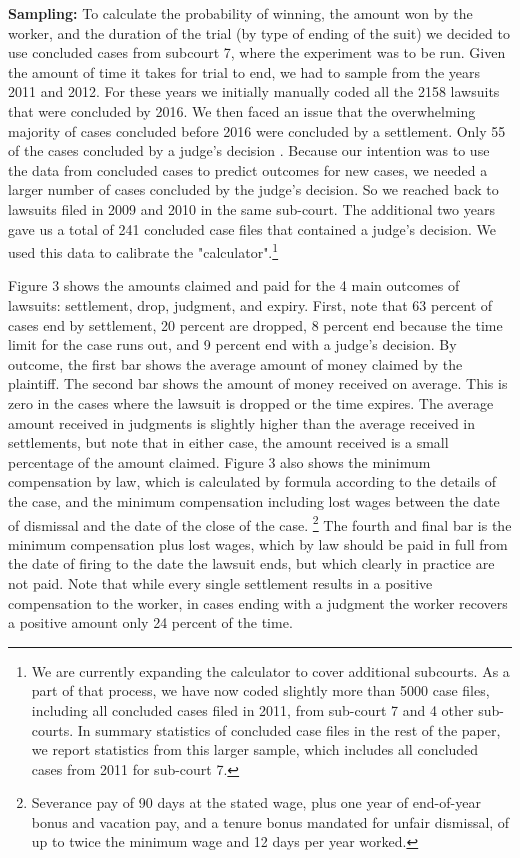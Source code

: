 \documentclass[11pt]{article}
\begin{document}
\textbf{Sampling:} To calculate the probability of winning, the amount won by the worker, and the
duration of the trial (by type of ending of the suit) we decided to use concluded cases from subcourt 7, where the experiment was to be run. Given the amount of time it takes for trial to end, we had to sample from the years 2011 and 2012. For these years we initially manually coded all the 2158 lawsuits  that were concluded by 2016. We then faced an issue that the overwhelming majority of cases concluded before 2016 were concluded by a settlement. Only 55 of the cases concluded by a judge’s decision . Because our intention was to use the data from concluded cases to predict outcomes for new cases, we needed a larger number of cases concluded by the judge’s decision. So we reached back to lawsuits filed in 2009 and 2010 in the same sub-court. The additional two years gave us a total of 241 concluded case files that contained a judge’s decision. We used this data to calibrate the "calculator".\footnote{We are currently expanding the calculator to cover additional subcourts. As a part of that process, we have now coded slightly more than 5000 case files, including all concluded cases filed in 2011, from sub-court 7 and 4 other sub-courts. In summary statistics of concluded case files in the rest of the paper, we report statistics from this larger sample, which includes all concluded cases from 2011 for sub-court 7.} 

Figure 3 shows the amounts claimed and paid for the 4 main outcomes of lawsuits: settlement, drop, judgment, and expiry. First, note that 63 percent of cases end by settlement, 20 percent are dropped, 8 percent end because the time limit for the case runs out, and 9 percent end with a judge’s decision. By outcome, the first bar shows the average amount of money claimed by the plaintiff. The second bar shows the amount of money received on average. This is zero in the cases where the lawsuit is dropped or the time expires. The average amount received in judgments is slightly higher than the average received in settlements, but note that in either case, the amount received is a small percentage of the amount claimed. Figure 3 also shows the minimum compensation by law, which is calculated by formula according to the details of the case, and the minimum compensation including lost wages between the date of dismissal and the date of the close of the case. \footnote{Severance pay of 90 days at the stated wage, plus one year of end-of-year bonus and vacation pay, and a tenure bonus mandated for unfair dismissal, of up to twice the minimum wage and 12 days per year worked.}  The fourth and final bar is the minimum compensation plus lost wages, which by law should be paid in full from the date of firing to the date the lawsuit ends, but which clearly in practice are not paid. Note that while every single settlement results in a positive compensation to the worker, in cases ending with a judgment the worker recovers a positive amount only 24 percent of the time. 
\end{document}

